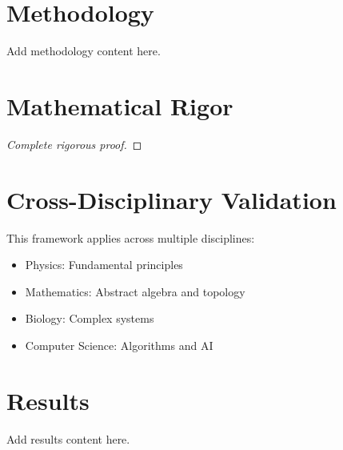 \documentclass[11pt,a4paper]{article}
\begin{document}
\section{Methodology}
\label{sec:methodology}

Add methodology content here.



\section{Mathematical Rigor}

\begin{theorem}
\end{theorem}

\begin{proof}
[Complete rigorous proof]
\end{proof}


\section{Cross-Disciplinary Validation}

This framework applies across multiple disciplines:
\begin{itemize}
    \item Physics: Fundamental principles
    \item Mathematics: Abstract algebra and topology
    \item Biology: Complex systems
    \item Computer Science: Algorithms and AI
\end{itemize}

\section{Results}
\label{sec:results}

Add results content here.
\end{document}
